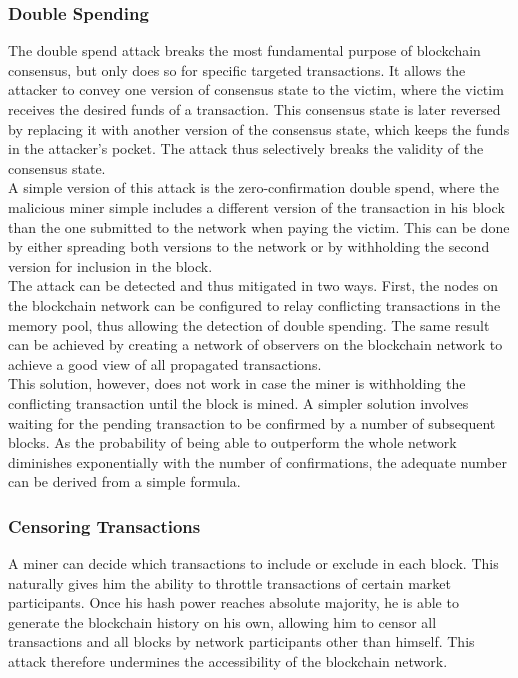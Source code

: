 \documentclass[12pt,a4paper]{article}
\begin{document}
\subsubsection{Double Spending}

The double spend attack breaks the most fundamental purpose of blockchain consensus, but only does so for specific targeted transactions. It allows the attacker to convey one version of consensus state to the victim, where the victim receives the desired funds of a transaction. This consensus state is later reversed by replacing it with another version of the consensus state, which keeps the funds in the attacker's pocket. The attack thus selectively breaks the validity of the consensus state.\\

A simple version of this attack is the zero-confirmation double spend, where the malicious miner simple includes a different version of the transaction in his block than the one submitted to the network when paying the victim. This can be done by either spreading both versions to the network or by withholding the second version for inclusion in the block.\\

The attack can be detected and thus mitigated in two ways. First, the nodes on the blockchain network can be configured to relay conflicting transactions in the memory pool, thus allowing the detection of double spending. The same result can be achieved by creating a network of observers on the blockchain network to achieve a good view of all propagated transactions.\\

This solution, however, does not work in case the miner is withholding the conflicting transaction until the block is mined. A simpler solution involves waiting for the pending transaction to be confirmed by a number of subsequent blocks. As the probability of being able to outperform the whole network diminishes exponentially with the number of confirmations, the adequate number can be derived from a simple formula.\\

\subsubsection{Censoring Transactions}

A miner can decide which transactions to include or exclude in each block. This naturally gives him the ability to throttle transactions of certain market participants. Once his hash power reaches absolute majority, he is able to generate the blockchain history on his own, allowing him to censor all transactions and all blocks by network participants other than himself. This attack therefore undermines the accessibility of the blockchain network.\\
\end{document}
